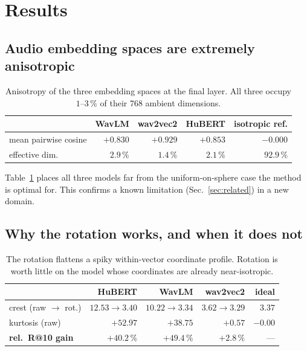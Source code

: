 \documentclass[conference]{IEEEtran}
\begin{document}
\section{Results}

\subsection{Audio embedding spaces are extremely anisotropic}
\label{sec:anisotropy}

\begin{table}[t]
\centering
\caption{Anisotropy of the three embedding spaces at the final layer. All three occupy $1$--$3\,\%$
of their 768 ambient dimensions.}
\label{tab:anisotropy}
\begin{tabular}{lrrrr}
\toprule
 & WavLM & wav2vec2 & HuBERT & isotropic ref. \\
\midrule
mean pairwise cosine & $+0.830$ & $+0.929$ & $+0.853$ & $-0.000$ \\
effective dim. & $2.9\,\%$ & $1.4\,\%$ & $2.1\,\%$ & $92.9\,\%$ \\
\bottomrule
\end{tabular}
\end{table}

Table~\ref{tab:anisotropy} places all three models far from the uniform-on-sphere case the method
is optimal for. This confirms a known limitation (Sec.~\ref{sec:related}) in a new domain.

\subsection{Why the rotation works, and when it does not}
\label{sec:mechanism}

\begin{table}[t]
\centering
\caption{The rotation flattens a spiky within-vector coordinate profile. Rotation is worth little
on the model whose coordinates are already near-isotropic.}
\label{tab:mechanism}
\begin{tabular}{lrrrr}
\toprule
 & HuBERT & WavLM & wav2vec2 & ideal \\
\midrule
crest (raw $\rightarrow$ rot.) & $12.53{\rightarrow}3.40$ & $10.22{\rightarrow}3.34$ & $3.62{\rightarrow}3.29$ & $3.37$ \\
kurtosis (raw) & $+52.97$ & $+38.75$ & $+0.57$ & $-0.00$ \\
\midrule
\textbf{rel.\ R@10 gain} & $\mathbf{+40.2\,\%}$ & $\mathbf{+49.4\,\%}$ & $\mathbf{+2.8\,\%}$ & --- \\
\bottomrule
\end{tabular}
\end{table}
\end{document}
